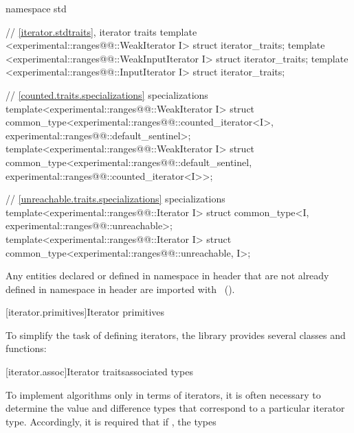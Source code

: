 \begin{addedblock}
\begin{codeblock}
namespace std {
  // \ref{iterator.stdtraits}, iterator traits
  template <experimental::ranges@@::WeakIterator I>
    struct iterator_traits;
  template <experimental::ranges@@::WeakInputIterator I>
    struct iterator_traits;
  template <experimental::ranges@@::InputIterator I>
    struct iterator_traits;

  // \ref{counted.traits.specializations}  specializations
  template<experimental::ranges@@::WeakIterator I>
    struct common_type<experimental::ranges@@::counted_iterator<I>,
                       experimental::ranges@@::default_sentinel>;
  template<experimental::ranges@@::WeakIterator I>
    struct common_type<experimental::ranges@@::default_sentinel,
                       experimental::ranges@@::counted_iterator<I>>;

  // \ref{unreachable.traits.specializations}  specializations
  template<experimental::ranges@@::Iterator I>
    struct common_type<I, experimental::ranges@@::unreachable>;
  template<experimental::ranges@@::Iterator I>
    struct common_type<experimental::ranges@@::unreachable, I>;
}
\end{codeblock}

\pnum
Any entities declared or defined in namespace  in header 
that are not already defined in namespace  in header
 are imported with
~(). 
\end{addedblock}

[iterator.primitives]{Iterator primitives}

\pnum
To simplify the task of defining iterators, the library provides
several classes and functions:

[iterator.assoc]{Iterator \textcolor{remclr}{traits}\textcolor{addclr}{associated types}}

\pnum
To implement algorithms only in terms of iterators, it is often necessary to
determine the value and
difference types that correspond to a particular iterator type.
Accordingly, it is required that if
, the types

